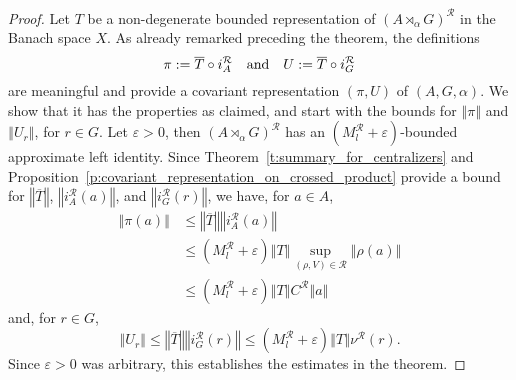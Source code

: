 \documentclass{amsart}
\theoremstyle{plain}
\theoremstyle{definition}
\numberwithin{equation}{section}
\begin{document}
\begin{proof}
Let $T$ be a non-degenerate bounded representation of ${(A {\rtimes}_\alpha G)^\mathcal{R}}$ in the Banach space $X$. As already remarked preceding the theorem, the definitions
\[
\pi := \overline{T}\circ i_A^{\mathcal R} \quad \textup{and} \quad U := \overline{T}\circ i_G^{\mathcal R}
\]
are meaningful and provide a covariant representation ${(\pi,U)}$ of ${(A,G,\alpha)}$.
We show that it has the properties as claimed, and start with the bounds for ${\left\Vert {\pi} \right\Vert}$ and ${\left\Vert {U_r} \right\Vert}$, for $r\in G$. Let ${\varepsilon} > 0$, then ${(A {\rtimes}_\alpha G)^\mathcal{R}}$ has an $(M_l^{\mathcal R} + {\varepsilon})$-bounded approximate left identity. Since Theorem~\ref{t:summary_for_centralizers} and Proposition~\ref{p:covariant_representation_on_crossed_product} provide a bound for ${\left\Vert {\overline T} \right\Vert}$, ${\left\Vert {i_A^{\mathcal R}(a)} \right\Vert}$, and ${\left\Vert {i_G^{\mathcal R} (r)} \right\Vert}$, we have, for $a\in A$,
\begin{align*}
{\left\Vert {\pi(a)} \right\Vert} &\leq {\left\Vert {\overline{T}} \right\Vert} {\left\Vert {i_A^{\mathcal R}(a)} \right\Vert} \\
&\leq (M_l^{\mathcal R} + {\varepsilon}) {\left\Vert {T} \right\Vert}  \sup_{(\rho,V)\in {\mathcal R}} {\left\Vert {\rho(a)} \right\Vert}\\
&\leq (M_l^{\mathcal R} + {\varepsilon}) {\left\Vert {T} \right\Vert}  {{C^{\mathcal R}}} {\left\Vert {a} \right\Vert}
\end{align*}
and, for $r\in G$,
\[
{\left\Vert {U_r} \right\Vert} \leq {\left\Vert {\overline{T}} \right\Vert} {\left\Vert {i_G^{\mathcal R}(r)} \right\Vert} \leq (M_l^{\mathcal R} + {\varepsilon}){\left\Vert {T} \right\Vert}  {\nu^{\mathcal R}}(r).
\]
Since ${\varepsilon}>0$ was arbitrary, this establishes the estimates in the theorem.


\end{proof}
\end{document}
